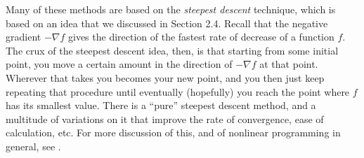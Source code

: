 Many of these methods are based on the \emph{steepest
descent} technique, which is based on an idea that we discussed in Section 2.4. Recall that the negative gradient
$-\nabla f$ gives the direction of the fastest rate of decrease of a function $f$. 
The crux of the steepest descent idea, then, is that starting from some initial point, you move a certain amount in the direction of $-\nabla f$ at that point. 
Wherever that takes you becomes your new point, and you then just keep repeating that procedure until
eventually (hopefully) you reach the point where $f$ has its smallest value. There is a ``pure'' steepest descent
method, and a multitude of variations on it that improve the rate of convergence, ease of calculation, etc. 
For more discussion of this, and of nonlinear programming in general, see \cite{bss}.
\startexercises\label{sec2dot6}
\vspace{1mm}
